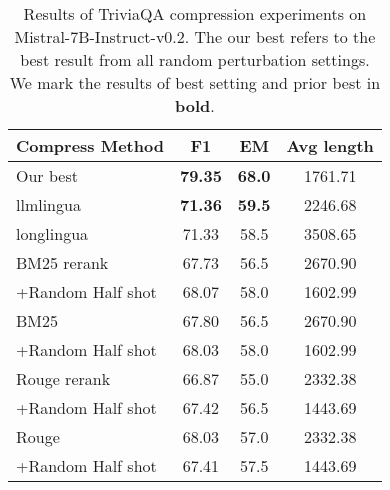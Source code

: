 \begin{table}[tp]
\renewcommand\arraystretch{1.1}
\centering
\small
\begin{tabular}{l|ccc}
\hline
 \textbf{Compress Method} & \textbf{F1} & \textbf{EM} & \textbf{Avg length}\\
\hline
Our best & \textbf{79.35} & \textbf{68.0} & 1761.71\\
llmlingua & \textbf{71.36} & \textbf{59.5} & 2246.68\\
longlingua & 71.33 & 58.5 & 3508.65\\
BM25 rerank & 67.73 & 56.5 & 2670.90\\
\quad+Random Half shot & 68.07 & 58.0 & 1602.99\\
BM25 & 67.80 & 56.5 & 2670.90\\
\quad+Random Half shot& 68.03 & 58.0 & 1602.99\\
Rouge rerank & 66.87 & 55.0 & 2332.38\\
\quad+Random Half shot& 67.42 & 56.5 & 1443.69\\
Rouge & 68.03 & 57.0 & 2332.38\\
\quad+Random Half shot& 67.41 & 57.5 & 1443.69\\
\hline
\end{tabular}
\caption{Results of TriviaQA compression experiments on Mistral-7B-Instruct-v0.2. The our best refers to the best result from all random perturbation settings. We mark the results of best setting and prior best in \textbf{bold}. }
\label{tab:comp_qa}
\end{table}